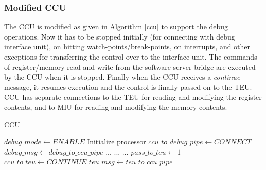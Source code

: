  \subsubsection{Modified CCU}
 The CCU is modified as given in Algorithm \ref{ccu} to support the debug operations. Now it has to be stopped initially (for connecting with debug interface unit), on hitting watch-points/break-points, on interrupts, and other exceptions for transferring the control over to the interface unit. The commands of register/memory read and write from the software server bridge are executed by the CCU when it is stopped. Finally when the CCU receives a \textit{continue} message, it resumes execution and the control is finally passed on to the TEU. CCU has separate connections to the TEU for reading and modifying the register contents, and to MIU for reading and modifying the memory contents.
 
 \begin{algorithm}
 	\caption{CCU}\label{ccu}
 	\begin{algorithmic}[1]
 		\State $debug\_mode \gets ENABLE$
 		\State Initialize processor
 		\State $ccu\_to\_debug\_pipe \gets CONNECT$
 		\State $debug\_msg\gets debug\_to\_ccu\_pipe$	
 		\EndWhile
 		\State {}
	 		\State ...
	 		\State {}
	 		\EndIf
	 		\State ...
	 		\State {}
	 		\EndIf
	 		\State ...
	 		\State $pass\_to\_teu \gets 1$
	 		\State $ccu\_to\_teu \gets CONTINUE$
	 		\State $teu\_msg \gets teu\_to\_ccu\_pipe$
	 	\end{algorithmic}
	 \end{algorithm}
	 
